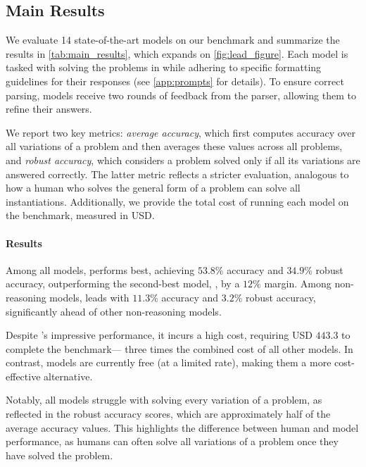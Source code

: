 \vspace{-1mm}
\subsection{Main Results} \label{sec:main_results}

We evaluate 14 state-of-the-art models on our benchmark and summarize the results in \cref{tab:main_results}, which expands on \cref{fig:lead_figure}. Each model is tasked with solving the problems in \mc while adhering to specific formatting guidelines for their responses (see \cref{app:prompts} for details). To ensure correct parsing, models receive two rounds of feedback from the parser, allowing them to refine their answers.

We report two key metrics: \emph{average accuracy}, which first computes accuracy over all variations of a problem and then averages these values across all problems, and \emph{robust accuracy}, which considers a problem solved only if all its variations are answered correctly. The latter metric reflects a stricter evaluation, analogous to how a human who solves the general form of a problem can solve all instantiations. Additionally, we provide the total cost of running each model on the benchmark, measured in USD.


\paragraph{Results} Among all models, \othree{} performs best, achieving $53.8\%$ accuracy and $34.9\%$ robust accuracy, outperforming the second-best model, \oone{}, by a $12\%$ margin. Among non-reasoning models, \flash{} leads with $11.3\%$ accuracy and $3.2\%$ robust accuracy, significantly ahead of other non-reasoning models.

Despite \oone{}'s impressive performance, it incurs a high cost, requiring USD $443.3$ to complete the benchmark— three times the combined cost of all other models. In contrast, \gemini{} models are currently free (at a limited rate), making them a more cost-effective alternative.

Notably, all models struggle with solving every variation of a problem, as reflected in the robust accuracy scores, which are approximately half of the average accuracy values. This highlights the difference between human and model performance, as humans can often solve all variations of a problem once they have solved the problem.



